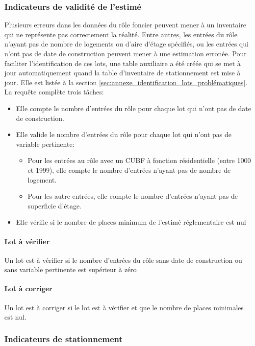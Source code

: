         \subsubsection{Indicateurs de validité de l'estimé}
        Plusieurs erreurs dans les données du rôle foncier peuvent mener à un inventaire qui ne représente pas correctement la réalité. Entre autres, les entrées du rôle n'ayant pas de nombre de logements ou d'aire d'étage spécifiés, ou les entrées qui n'ont pas de date de construction peuvent mener à une estimation erronée. Pour faciliter l'identification de ces lots, une table auxiliaire a été créée qui se met à jour automatiquement quand la table d'inventaire de stationnement est mise à jour. Elle est listée à la section \ref{sec:annexe_identification_lots_problématiques}. La requête complète trois tâches:
        \begin{itemize}
            \item Elle compte le nombre d'entrées du rôle pour chaque lot qui n'ont pas de date de construction.
            \item Elle valide le nombre d'entrées du rôle pour chaque lot qui n'ont pas de variable pertinente:
            \begin{itemize}
                \item Pour les entrées au rôle avec un \ac{CUBF} à fonction résidentielle (entre 1000 et 1999), elle compte le nombre d'entrées n'ayant pas de nombre de logement.
                \item Pour les autre entrées, elle compte le nombre d'entrées n'ayant pas de superficie d'étage.
            \end{itemize}
            \item Elle vérifie si le nombre de places minimum de l'estimé réglementaire est nul
        \end{itemize}
            \paragraph{Lot à vérifier} Un lot est à vérifier si le nombre d'entrées du rôle sans date de construction ou sans variable pertinente est supérieur à zéro
            \paragraph{Lot à corriger} Un lot est à corriger si le lot est à vérifier et que le nombre de places minimales est nul.
        \subsubsection{Indicateurs de stationnement}

